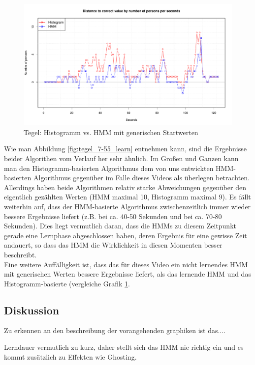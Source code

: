 \begin{figure}
	\centering
\includegraphics[width=1\textwidth]{bilder/safest_plot_tegel_7-55_hmm_nolearn.pdf}
	\caption{Tegel: Histogramm vs. HMM mit generischen Startwerten}
	\label{fig:tegel_7-55_nolearn}
\end{figure}
Wie man Abbildung \ref{fig:tegel_7-55_learn} entnehmen kann, sind die Ergebnisse beider Algorithen vom Verlauf her sehr ähnlich. Im Großen und Ganzen kann man den Histogramm-basierten Algorithmus dem von uns entwickten HMM-basierten Algorithmus gegenüber im Falle dieses Videos als überlegen betrachten.
Allerdings haben beide Algorithmen relativ starke Abweichungen gegenüber den eigentlich gezählten Werten (HMM maximal 10, Histogramm maximal 9).
Es fällt weiterhin auf, dass der HMM-basierte Algorithmus zwischenzeitlich immer wieder bessere Ergebnisse liefert (z.B. bei ca. 40-50 Sekunden und bei ca. 70-80 Sekunden).
Dies liegt vermutlich daran, dass die HMMs zu diesem Zeitpunkt gerade eine Lernphase abgeschlossen haben, deren Ergebnis für eine gewisse Zeit andauert, so dass das HMM die Wirklichkeit in diesen Momenten besser beschreibt.\\
Eine weitere Auffälligkeit ist, dass das für dieses Video ein nicht lernendes HMM mit generischen Werten bessere Ergebnisse liefert, als das lernende HMM und das Histogramm-basierte (vergleiche Grafik \ref{fig:tegel_7-55_nolearn}.

\subsection{Diskussion}
\label{sec:diskuss}

Zu erkennen an den beschreibung der vorangehenden graphiken ist das....

Lerndauer vermutlich zu kurz, daher stellt sich das HMM nie richtig ein und es kommt zusätzlich zu Effekten wie Ghosting.

